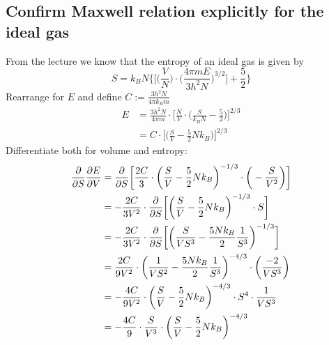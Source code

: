 \subsection{Confirm Maxwell relation explicitly for the ideal gas}
    From the lecture we know that the entropy of an ideal gas is given by 
    \begin{equation}
        S=k_BN\bigg\{\bigg[\bigg(\frac{V}{N}\bigg)\cdot
        \bigg(\frac{4\pi mE}{3h^2N}\bigg)^{3/2}\bigg]+\frac{5}{2}\bigg\}
    \end{equation}
    Rearrange for $E$ and define $C:=\frac{3h^2N}{4\pi k_Bm}$
    \begin{align}
        E&=
        \frac{3h^2N}{4\pi m}\cdot
        \bigg[\frac{N}{V}\cdot
        \bigg(\frac{S}{k_BN}-\frac{5}{2}
        \bigg)\bigg]^{2/3} \\
        &=
        C\cdot
        \bigg[\bigg(\frac{S}{V}-\frac{5}{2}Nk_B
        \bigg)\bigg]^{2/3}
    \end{align}
    Differentiate both for volume and entropy:
    \begin{align}
        \frac{\partial }{\partial S}\frac{\partial E}{\partial V}     
        &=\frac{\partial }{\partial S}\bigg[
            \frac{2C}{3}\cdot
            \bigg(\frac{S}{V}-\frac{5}{2}Nk_B\bigg)^{-1/3}
            \cdot\bigg(-\frac{S}{V^2}\bigg)
        \bigg] \\
        &=-\frac{2C}{3V^2}\cdot\frac{\partial }{\partial S}\bigg[
            \bigg(\frac{S}{V}-\frac{5}{2}Nk_B\bigg)^{-1/3}
            \cdot S
        \bigg] \\
        &=-\frac{2C}{3V^2}\cdot\frac{\partial }{\partial S}\bigg[
            \bigg(\frac{S}{VS^3}-\frac{5Nk_B}{2}\frac{1}{S^3}\bigg)^{-1/3}
        \bigg] \\
        &=\frac{2C}{9V^2}\cdot\bigg(
            \frac{1}{VS^2}-\frac{5Nk_B}{2}\frac{1}{S^3}
        \bigg)^{-4/3}\cdot\bigg(
            \frac{-2}{VS^3}
        \bigg) \\
        &=-\frac{4C}{9V^2}\cdot\bigg(
            \frac{S}{V}-\frac{5}{2}Nk_B
        \bigg)^{-4/3}\cdot S^4\cdot\frac{1}{VS^3} \\
        &=-\frac{4C}{9}\cdot\frac{S}{V^3}\cdot\bigg(
            \frac{S}{V}-\frac{5}{2}Nk_B
        \bigg)^{-4/3}
    \end{align}
